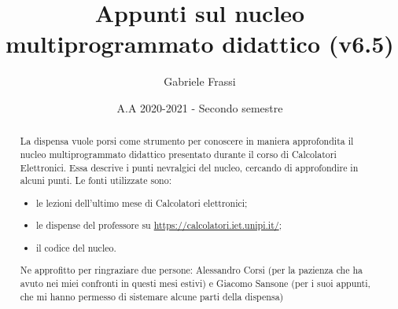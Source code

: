 \documentclass[11pt]{report}
\theoremstyle{definition}
\begin{document}
	
\author{Gabriele Frassi}
\title{Appunti sul nucleo multiprogrammato didattico (v6.5)}
\date{A.A 2020-2021 - Secondo semestre}
\maketitle

\begin{abstract}
	La dispensa vuole porsi come strumento per conoscere in maniera approfondita il nucleo multiprogrammato didattico presentato durante il corso di Calcolatori Elettronici. Essa descrive i punti nevralgici del nucleo, cercando di approfondire in alcuni punti. Le fonti utilizzate sono:
	\begin{itemize}
		\item le lezioni dell'ultimo mese di Calcolatori elettronici;
		\item le dispense del professore su \url{https://calcolatori.iet.unipi.it/};
		\item il codice del nucleo.
	\end{itemize}
	Ne approfitto per ringraziare due persone: Alessandro Corsi (per la pazienza che ha avuto nei miei confronti in questi mesi estivi) e Giacomo Sansone (per i suoi appunti, che mi hanno permesso di sistemare alcune parti della dispensa)
\end{abstract}

\tableofcontents
\end{document}
